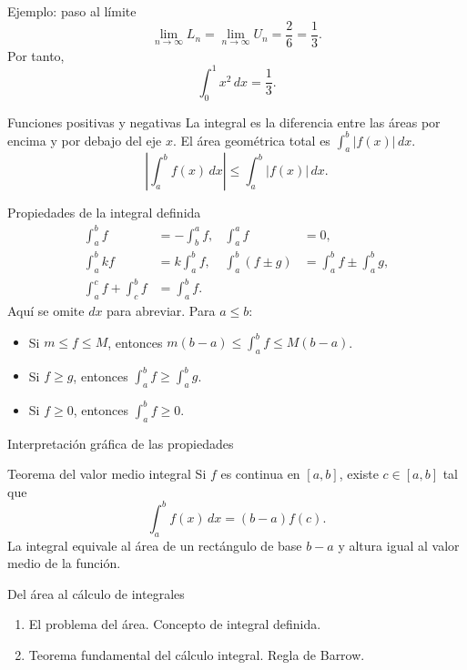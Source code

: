 \documentclass[original_version/main.tex]{subfiles}
\begin{document}
\begin{frame}{Ejemplo: paso al límite}
\[\lim_{n\to\infty}L_n=\lim_{n\to\infty}U_n=\frac26=\frac13.\]Por tanto,\[\boxed{\int_0^1 x^2\,dx=\frac13.}\]
\end{frame}

\begin{frame}{Funciones positivas y negativas}
La integral es la diferencia entre las áreas por encima y por debajo del eje $x$. El área geométrica total es $\int_a^b|f(x)|\,dx$.\[\left|\int_a^b f(x)\,dx\right|\le\int_a^b|f(x)|\,dx.\]
\end{frame}

\begin{frame}{Propiedades de la integral definida}
\footnotesize\begin{align*}\int_a^b f&=-\int_b^a f,&\int_a^a f&=0,\\ \int_a^b kf&=k\int_a^b f,&\int_a^b(f\pm g)&=\int_a^b f\pm\int_a^b g,\\ \int_a^c f+\int_c^b f&=\int_a^b f.\end{align*}Aquí se omite $dx$ para abreviar. Para $a\le b$:\begin{itemize}\item Si $m\le f\le M$, entonces $m(b-a)\le\int_a^b f\le M(b-a)$.\item Si $f\ge g$, entonces $\int_a^b f\ge\int_a^b g$.\item Si $f\ge0$, entonces $\int_a^b f\ge0$.\end{itemize}
\end{frame}

\begin{frame}{Interpretación gráfica de las propiedades}
\end{frame}

\begin{frame}{Teorema del valor medio integral}
Si $f$ es continua en $[a,b]$, existe $c\in[a,b]$ tal que\[\int_a^b f(x)\,dx=(b-a)f(c).\]La integral equivale al área de un rectángulo de base $b-a$ y altura igual al valor medio de la función.
\end{frame}

\begin{frame}{Del área al cálculo de integrales}
\begin{enumerate}\item El problema del área. Concepto de integral definida.\item Teorema fundamental del cálculo integral. Regla de Barrow.\end{enumerate}
\end{frame}
\end{document}
